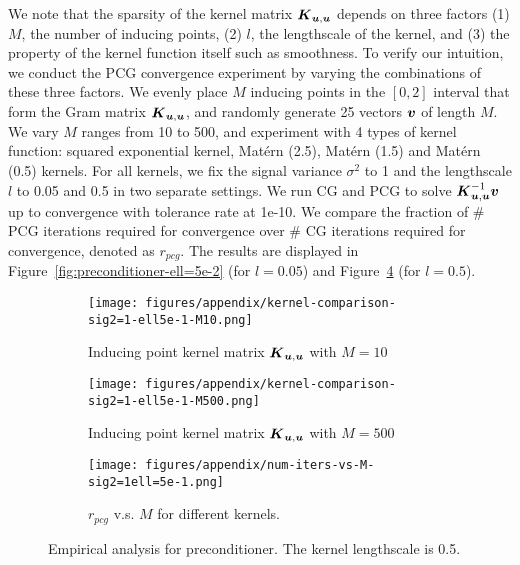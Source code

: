 We note that the sparsity of the kernel matrix $\boldsymbol{K}_{\boldsymbol{u}, \boldsymbol{u}}$ depends on three factors
(1) $M$, the number of inducing points, (2) $l$, the lengthscale of the kernel,
and (3) the property of the kernel function itself such as smoothness. 
To verify our intuition, we conduct the PCG convergence experiment
by varying the combinations of these three factors.
We evenly place $M$ inducing points in the $[0,2]$ interval that form the Gram matrix $\boldsymbol{K}_{\boldsymbol{u}, \boldsymbol{u}}$,
and randomly generate 25 vectors $\boldsymbol{v}$ of length $M$. We vary $M$ ranges from 10 to 500, and experiment with 4 types of kernel function: squared exponential kernel,
Matérn (2.5), Matérn (1.5) and Matérn (0.5) kernels.
For all kernels, we fix the signal variance $\sigma^2$ to  1
and the lengthscale $l$ to 0.05 and 0.5 in two separate settings.
We run CG and PCG to solve $\boldsymbol{K}_{\boldsymbol{u}, \boldsymbol{u}}^{-1} \boldsymbol{v}$
up to convergence with tolerance rate at 1e-10.
We compare the fraction of \# PCG iterations required for convergence over
\# CG iterations required for convergence, denoted as $r_{pcg}$.
The results are displayed in Figure~\ref{fig:preconditioner-ell=5e-2} (for $l=0.05$)
and Figure~\ref{fig:preconditioner-ell=5e-1} (for $l=0.5$).



\begin{figure}[t!]
\centering
\begin{subfigure}{0.8\columnwidth}
  \texttt{[image: figures/appendix/kernel-comparison-sig2=1-ell5e-1-M10.png]}
  \caption{Inducing point kernel matrix $\boldsymbol{K}_{\boldsymbol{u}, \boldsymbol{u}}$ with $M=10$}
	\label{fig:ell5e-1-M10}
  \vspace{0.25cm}
\end{subfigure}
\begin{subfigure}{0.8\columnwidth}
  \texttt{[image: figures/appendix/kernel-comparison-sig2=1-ell5e-1-M500.png]}
  \caption{Inducing point kernel matrix $\boldsymbol{K}_{\boldsymbol{u}, \boldsymbol{u}}$ with $M=500$}
	\label{fig:ell5e-1-M500}
  \vspace{0.25cm}
\end{subfigure}
\begin{subfigure}{0.8\columnwidth}
  \texttt{[image: figures/appendix/num-iters-vs-M-sig2=1ell=5e-1.png]}
  \caption{$r_{pcg}$ v.s. $M$ for different kernels. }
	\label{fig:ell5e-1-convergence}
  \vspace{0.25cm}
\end{subfigure}
\caption{Empirical analysis for preconditioner. The kernel lengthscale is 0.5. }
\label{fig:preconditioner-ell=5e-1}
\end{figure}

